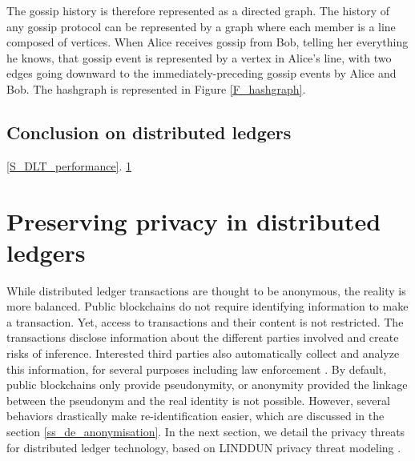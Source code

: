 The gossip history is therefore represented as a directed graph. The history of any
gossip protocol can be represented by a graph where each member
is a line composed of vertices. When Alice receives gossip from Bob,
telling her everything he knows, that gossip event is represented
by a vertex in Alice's line, with two edges going downward
to the immediately-preceding gossip events by Alice and Bob. 
The hashgraph is represented in Figure \ref{F_hashgraph}.

\subsection{Conclusion on distributed ledgers}

 \ref{S_DLT_performance}.  \ref{S_privacy_DLT}

\section{Preserving privacy in distributed ledgers}
 \label{S_privacy_DLT}

While distributed ledger transactions are thought to be anonymous, the reality is more balanced. Public blockchains do not require identifying information to make a
transaction.  Yet, access to transactions and their content is not restricted. The transactions disclose information about the different parties involved and create risks of inference. Interested third parties also automatically collect and analyze
this information, for several purposes including law enforcement \cite{Harrigan2016}. By default, public blockchains only provide pseudonymity, or anonymity provided
the linkage between the pseudonym and the real identity is not possible. However, 
several behaviors drastically make re-identification easier, which are discussed in the section \ref{ss_de_anonymisation}.
In the next section, we detail the privacy threats for distributed ledger technology, based on LINDDUN privacy threat modeling \cite{Wuyts2015}.

